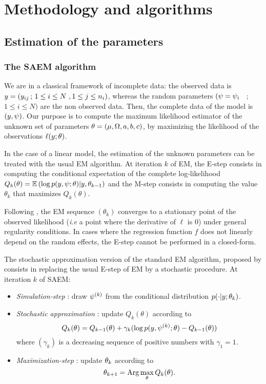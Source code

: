 
\chapter{Methodology and algorithms}  \label{chapter_methodology}
\section{Estimation of the parameters}
\subsection{The SAEM algorithm}\label{saem}

We are in a classical framework of incomplete data: the observed
data is $y=(y_{ij} \, ; \, 1  \leq i \leq N \ , 1 \leq j \leq
n_i)$, whereas the random parameters $(\psi={\psi_i}$ \, ; \, $1 \leq
i \leq N)$ are the non observed data. Then, the complete data of the
model is $(y,\psi)$. Our purpose is to compute the maximum
likelihood estimator of the unknown set of parameters
$\thetag=(\fixed_effect,\IIV,\ag,\bg,\cg)$, by maximizing the
likelihood of the observations $\ell(y ;\theta)$.

In the case of a linear model, the estimation of the unknown parameters can be treated with the
usual EM algorithm. At iteration $k$ of EM, the E-step consists in computing the conditional
expectation of the complete log-likelihood $Q_k(\theta)= \mathbb{E}\left(\log p(y,\psi;\theta) |
y,\theta_{k-1} \right)$ and the M-step consists in computing the value $\theta_{k}$ that maximizes
$Q_k(\theta)$.

Following \cite{dempster,wu}, the EM sequence $(\theta_k)$ converges
to a stationary point of the observed likelihood ({\it i.e} a point
where the derivative of $\ell$ is 0) under general regularity
conditions. In cases  where the regression function $f$ does not
linearly depend on the random  effects, the E-step cannot be
performed in a closed-form.

The stochastic approximation version  of the  standard EM  algorithm, proposed by \cite{marc}
 consists in replacing the usual E-step of EM by a stochastic
procedure. At iteration $k$ of SAEM:
\begin{itemize}
\item {\em Simulation-step} : draw $\psi^{(k)}$ from the
conditional distribution  $p(\cdot|y;{\theta_k})$.
\item {\em Stochastic approximation} : update $Q_k(\theta)$ according to
\begin{equation}
 Q_k(\theta) = Q_{k-1}(\theta) + \gamma_k ( \log p(y,\psi^{(k)};\theta) - Q_{k-1}(\theta) )
\end{equation}
where $(\gamma_k)$ is a decreasing sequence of positive numbers with $\gamma_1=1$.
\item {\em Maximization-step} : update ${\theta_k}$ according to
$${\theta_{k+1}}={\rm Arg}\max_{{\theta}} Q_k(\theta).$$

\end{itemize}


